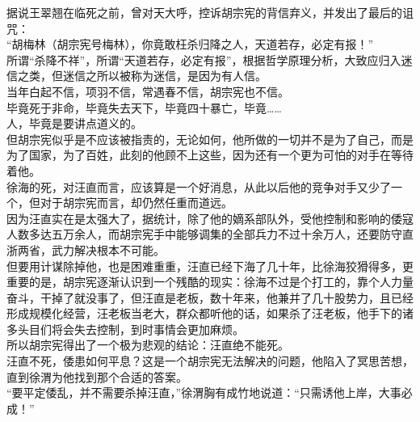 \begin{multicols}{\theparacolNo}
据说王翠翘在临死之前，曾对天大呼，控诉胡宗宪的背信弃义，并发出了最后的诅咒：\\

“胡梅林（胡宗宪号梅林），你竟敢枉杀归降之人，天道若存，必定有报！”\\

所谓“杀降不祥”，所谓“天道若存，必定有报”，根据哲学原理分析，大致应归入迷信之类，但迷信之所以被称为迷信，是因为有人信。\\

当年白起不信，项羽不信，常遇春不信，胡宗宪也不信。\\

毕竟死于非命，毕竟失去天下，毕竟四十暴亡，毕竟……\\

人，毕竟是要讲点道义的。\\

但胡宗宪似乎是不应该被指责的，无论如何，他所做的一切并不是为了自己，而是为了国家，为了百姓，此刻的他顾不上这些，因为还有一个更为可怕的对手在等待着他。\\

徐海的死，对汪直而言，应该算是一个好消息，从此以后他的竞争对手又少了一个，但对于胡宗宪而言，却仍然任重而道远。\\

因为汪直实在是太强大了，据统计，除了他的嫡系部队外，受他控制和影响的倭寇人数多达五万余人，而胡宗宪手中能够调集的全部兵力不过十余万人，还要防守直浙两省，武力解决根本不可能。\\

但要用计谋除掉他，也是困难重重，汪直已经下海了几十年，比徐海狡猾得多，更重要的是，胡宗宪逐渐认识到一个残酷的现实：徐海不过是个打工的，靠个人力量奋斗，干掉了就没事了，但汪直是老板，数十年来，他兼并了几十股势力，且已经形成规模化经营，汪老板当老大，群众都听他的话，如果杀了汪老板，他手下的诸多头目们将会失去控制，到时事情会更加麻烦。\\

所以胡宗宪得出了一个极为悲观的结论：汪直绝不能死。\\

汪直不死，倭患如何平息？这是一个胡宗宪无法解决的问题，他陷入了冥思苦想，直到徐渭为他找到那个合适的答案。\\

“要平定倭乱，并不需要杀掉汪直，”徐渭胸有成竹地说道：“只需诱他上岸，大事必成！”\\
\ifnum{}
	\end{multicols}
\fi
\newpage
